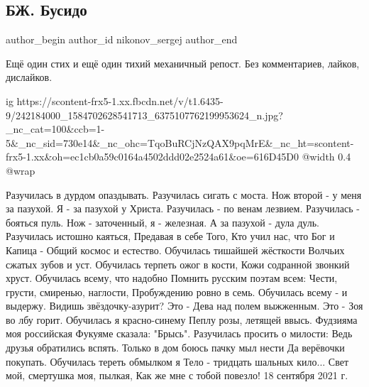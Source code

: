  
 
 
 
 
 
\subsection{БЖ. Бусидо}
\label{sec:19_09_2021.fb.nikonov_sergej.2.bilchenko_busido}
 
\ifcmt
 author_begin
   author_id nikonov_sergej
 author_end
\fi

Ещё один стих и ещё один тихий механичный репост. Без комментариев, лайков, дислайков. 


\ifcmt
  ig https://scontent-frx5-1.xx.fbcdn.net/v/t1.6435-9/242184000_1584702628541713_6375107762199953624_n.jpg?_nc_cat=100&ccb=1-5&_nc_sid=730e14&_nc_ohc=TqoBuRCjNzQAX9pqMrE&_nc_ht=scontent-frx5-1.xx&oh=ec1cb0a59c0164a4502ddd02e2524a61&oe=616D45D0
  @width 0.4
  @wrap 
\fi

\obeycr
Разучилась в дурдом опаздывать.
Разучилась сигать с моста.
Нож второй - у меня за пазухой.
Я - за пазухой у Христа.
Разучилась - по венам лезвием.
Разучилась - бояться пуль.
Нож - заточенный, я - железная.
А за пазухой - дула дуль.
Разучилась истошно каяться,
Предавая в себе Того,
Кто учил нас, что Бог и Капица -
Общий космос и естество.
Обучилась тишайшей жёсткости
Волчьих сжатых зубов и уст.
Обучилась терпеть ожог в кости,
Кожи содранной звонкий хруст.
Обучилась всему, что надобно
Помнить русским поэтам всем:
Чести, грусти, смиренью, наглости,
Пробуждению ровно в семь.
Обучилась всему - и выдержу.
Видишь звёздочку-азурит?
Это - Дева над полем выжженным.
Это - Зоя во лбу горит.
Обучилась я красно-синему
Пеплу розы, летящей ввысь.
Фудзияма моя российская
Фукуяме сказала: "Брысь".
Разучилась просить о милости:
Ведь друзья обратились вспять.
Только в дом боюсь пачку мыл нести
Да верёвочки покупать.
Обучилась тереть обмылком я
Тело - тридцать шальных кило...
Свет мой, смертушка моя, пылкая,
Как же мне с тобой повезло!
18 сентября 2021 г.
\restorecr
